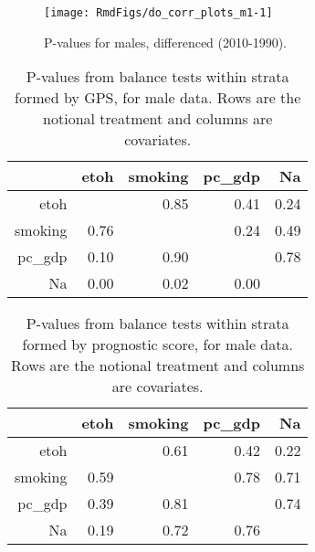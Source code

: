 \documentclass[11pt]{article}\usepackage[]{graphicx}\usepackage[]{color}
\makeatletter
\def\maxwidth{ %
  \ifdim\Gin@nat@width>\linewidth
    \linewidth
  \else
    \Gin@nat@width
  \fi
}
\newenvironment{knitrout}{}{} %
\makeatother
\begin{document}
\clearpage


\begin{knitrout}
\color{fgcolor}\begin{figure}
\texttt{[image: RmdFigs/do\_corr\_plots\_m1-1]} \caption[P-values for males, differenced (2010-1990)]{P-values for males, differenced (2010-1990).}\label{fig:do_corr_plots_m1}
\end{figure}


\end{knitrout}
\begin{table}[ht]
\centering
\begin{tabular}{r|rrrr}
  \hline
 & etoh & smoking & pc\_gdp & Na \\ 
  \hline
etoh &  & 0.85 & 0.41 & 0.24 \\ 
  smoking & 0.76 &  & 0.24 & 0.49 \\ 
  pc\_gdp & 0.10 & 0.90 &  & 0.78 \\ 
  Na & 0.00 & 0.02 & 0.00 &  \\ 
   \hline
\end{tabular}
\caption{P-values from balance tests within strata formed by GPS, for male data.
                    Rows are the notional treatment and columns are covariates.} 
\label{tab:gps_balance_m}
\end{table}
\begin{table}[ht]
\centering
\begin{tabular}{r|rrrr}
  \hline
 & etoh & smoking & pc\_gdp & Na \\ 
  \hline
etoh &  & 0.61 & 0.42 & 0.22 \\ 
  smoking & 0.59 &  & 0.78 & 0.71 \\ 
  pc\_gdp & 0.39 & 0.81 &  & 0.74 \\ 
  Na & 0.19 & 0.72 & 0.76 &  \\ 
   \hline
\end{tabular}
\caption{P-values from balance tests within strata formed by prognostic score, for male data.
                    Rows are the notional treatment and columns are covariates.} 
\label{tab:gps_balance_m}
\end{table}
\end{document}
